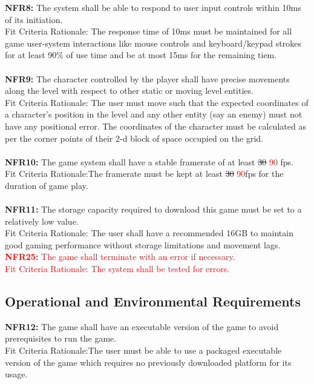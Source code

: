 \documentclass[12pt, titlepage]{article}
\begin{document}
\textbf{NFR8:} The system shall be able to respond to user input controls within 10ms of its initiation.\\
Fit Criteria Rationale: The response time of 10ms must be maintained for all game user-system interactions like mouse controls and keyboard/keypad strokes for at least 90\% of use time and be at most 15ms for the remaining tiem.\\\\
\textbf{NFR9:} The character controlled by the player shall have precise movements along the level with respect to other static or moving level entities.\\
Fit Criteria Rationale: The user must move such that the expected coordinates of a character's position in the level and any other entity (say an enemy) must not have any positional error. The coordinates of the character must be calculated as per the corner points of their 2-d block of space occupied on the grid.\\\\
\textbf{NFR10:} The game system shall have a stable framerate of at least \st{30} \textcolor{red}{90} fps.\\
Fit Criteria Rationale:The framerate must be kept at least \st{30} \textcolor{red}{90}fps for the duration of game play. \\\\
\textbf{NFR11:} The storage capacity required to download this game must be set to a relatively low value.\\
Fit Criteria Rationale: The user shall have a recommended 16GB to maintain good gaming performance without storage limitations and movement lags.\\
\textcolor{red}{\textbf{NFR25:} The game shall terminate with an error if necessary.\\
Fit Criteria Rationale: The system shall be tested for errors.\\}

\subsection{Operational and Environmental Requirements}

\textbf{NFR12:} The game shall have an executable version of the game to avoid prerequisites to run the game.\\
Fit Criteria Rationale:The user must be able to use a packaged executable version of the game which requires no previously downloaded platform for its usage.\\\\
\end{document}
